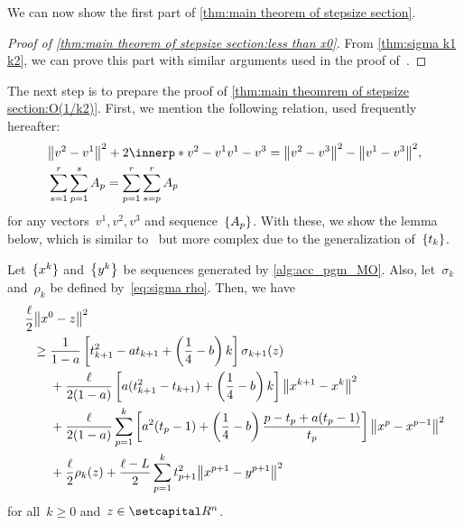 \documentclass[../main]{subfiles}
\begin{document}
We can now show the first part of \cref{thm:main theorem of stepsize section}.
\begin{proof}[Proof of \cref{thm:main theorem of stepsize section:less than x0}]
    From \cref{thm:sigma k1 k2}, we can prove this part with similar arguments used in the proof of~\cite[Theorem~5.1]{Tanabe2022a}.
\end{proof}

The next step is to prepare the proof of \cref{thm:main theomrem of stepsize section:O(1/k2)}.
First, we mention the following relation, used frequently hereafter:
\begin{align}
        &\norm*{v^2 - v^1}^2 + 2 \innerp*{v^2 - v^1}{v^1 - v^3} = \norm*{ v^2 - v^3 }^2 - \norm*{v^1 - v^3}^2 , \label{eq:Pythagoras} \\
        &\sum_{s=1}^r \sum_{p=1}^s A_p = \sum_{p=1}^r \sum_{s=p}^r A_p \label{eq:change sum}
\end{align}
for any vectors~$v^1, v^2, v^3$ and sequence~$\set*{A_p}$.
With these, we show the lemma below, which is similar to~\cite[Lemma 5.2]{Tanabe2022a} but more complex due to the generalization of~$\set{t_k}$.
\begin{lemma} \label{thm:key relation}
    Let~$\set{x^k}$ and~$\set*{y^k}$ be sequences generated by \cref{alg:acc_pgm_MO}.
    Also, let~$\sigma_k$ and~$\rho_k$ be defined by~\cref{eq:sigma rho}.
    Then, we have
    \begin{align}
        \MoveEqLeft \frac{\ell}{2} \norm*{x^0 - z}^2 \\
        \ge{}& \frac{1}{1 - a} \left[ t_{k + 1}^2 - a t_{k + 1} + \left( \frac{1}{4} - b \right) k \right] \sigma_{k + 1}(z) \\
        &+ \frac{\ell}{2 (1 - a)} \left[ a (t_{k + 1}^2 - t_{k + 1}) + \left( \frac{1}{4} - b \right) k \right] \norm*{x^{k + 1} - x^k}^2 \\
        &+ \frac{\ell}{2 (1 - a)} \sum_{p = 1}^{k} \left[ a^2 (t_p - 1) + \left( \frac{1}{4} - b \right) \frac{p - t_p + a(t_p - 1)}{t_p} \right] \norm*{x^p - x^{p - 1}}^2 \\
        &+ \frac{\ell}{2} \rho_k(z) + \frac{\ell - L}{2} \sum_{p = 1}^{k} t_{p + 1}^2 \norm*{x^{p + 1} - y^{p + 1}}^2
    \end{align}
    for all~$k \ge 0$ and~$z \in \setR^n$.
\end{lemma}
\end{document}

